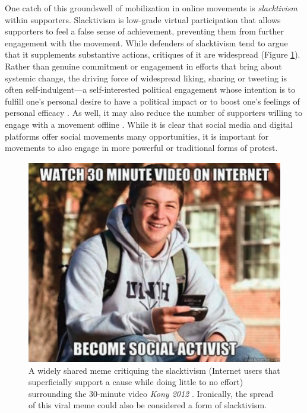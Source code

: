 \documentclass{article}
\begin{document}
One catch of this groundswell of mobilization in online movements is \textit{slacktivism} within supporters. Slacktivism is low-grade virtual participation that allows supporters to feel a false sense of achievement, preventing them from further engagement with the movement. While defenders of slacktivism tend to argue that it supplements substantive actions, critiques of it are widespread (Figure \ref{slacktivism}). Rather than genuine commitment or engagement in efforts that bring about systemic change, the driving force of widespread liking, sharing or tweeting is often self-indulgent—a self-interested political engagement whose intention is to fulfill one’s personal desire to have a political impact or to boost one’s feelings of personal efficacy \cite{dennis2019beyond}.  As well, it may also reduce the number of supporters willing to engage with a movement offline \cite{mundt2018scaling}. While it is clear that social media and digital platforms offer social movements many opportunities, it is important for movements to also engage in more powerful or traditional forms of protest. 

\begin{figure}[h]
    \includegraphics[width=.7 \textwidth]{./images/slacktivism.png}
    \centering
    \caption{A widely shared meme critiquing the slacktivism (Internet users that superficially support a cause while doing little to no effort) surrounding the 30-minute video \textit{Kony 2012} \cite{dennis2019beyond}. Ironically, the spread of this viral meme could also be considered a form of slacktivism.}
    \label{slacktivism}
\end{figure}
\end{document}
